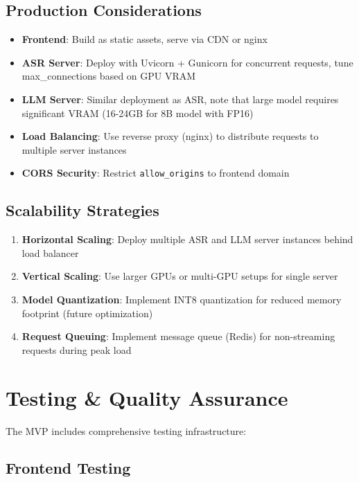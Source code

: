 \documentclass[12pt,a4paper]{report}
\begin{document}
\subsection{Production Considerations}

\begin{itemize}
    \item \textbf{Frontend}: Build as static assets, serve via CDN or nginx
    \item \textbf{ASR Server}: Deploy with Uvicorn + Gunicorn for concurrent requests, tune max\_connections based on GPU VRAM
    \item \textbf{LLM Server}: Similar deployment as ASR, note that large model requires significant VRAM (16-24GB for 8B model with FP16)
    \item \textbf{Load Balancing}: Use reverse proxy (nginx) to distribute requests to multiple server instances
    \item \textbf{CORS Security}: Restrict \texttt{allow\_origins} to frontend domain
\end{itemize}

\subsection{Scalability Strategies}

\begin{enumerate}
    \item \textbf{Horizontal Scaling}: Deploy multiple ASR and LLM server instances behind load balancer
    \item \textbf{Vertical Scaling}: Use larger GPUs or multi-GPU setups for single server
    \item \textbf{Model Quantization}: Implement INT8 quantization for reduced memory footprint (future optimization)
    \item \textbf{Request Queuing}: Implement message queue (Redis) for non-streaming requests during peak load
\end{enumerate}

\section{Testing \& Quality Assurance}

The MVP includes comprehensive testing infrastructure:

\subsection{Frontend Testing}
\end{document}
